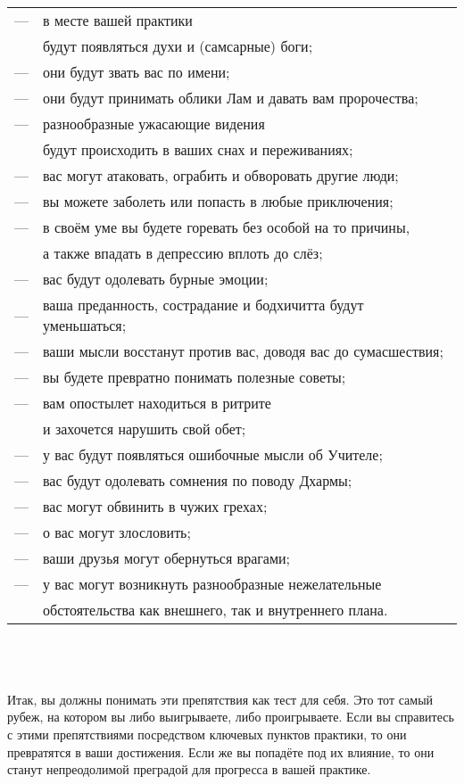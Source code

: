 \begin{tabular}{ll}
— & в месте вашей практики \\
  & будут появляться духи и (самсарные) боги;\\
— & они будут звать вас по имени;\\
— & они будут принимать облики Лам и давать вам пророчества;\\
— & разнообразные ужасающие видения \\
  & будут происходить в ваших снах и переживаниях;\\
— & вас могут атаковать, ограбить и обворовать другие люди;\\
— & вы можете заболеть или попасть в любые приключения;\\
— & в своём уме вы будете горевать без особой на то причины, \\
  & а также впадать в депрессию вплоть до слёз;\\
— & вас будут одолевать бурные эмоции;\\
— & ваша преданность, сострадание и бодхичитта будут уменьшаться;\\
— & ваши мысли восстанут против вас, доводя вас до сумасшествия;\\
— & вы будете превратно понимать полезные советы;\\
— & вам опостылет находиться в ритрите \\
  & и захочется нарушить свой обет;\\
— & у вас будут появляться ошибочные мысли об Учителе;\\
— & вас будут одолевать сомнения по поводу Дхармы;\\
— & вас могут обвинить в чужих грехах;\\
— & о вас могут злословить;\\
— & ваши друзья могут обернуться врагами;\\
— & у вас могут возникнуть разнообразные нежелательные \\
  &обстоятельства как внешнего, так и внутреннего плана.
  \end{tabular}
\normalsize
\\
\\
\\
Итак, вы должны понимать эти препятствия как тест для себя. Это тот самый рубеж, на котором вы либо выигрываете, либо проигрываете. Если вы справитесь с этими препятствиями посредством ключевых пунктов практики, то они превратятся в ваши достижения. Если же вы попадёте под их влияние, то они станут непреодолимой преградой для прогресса в вашей практике.
